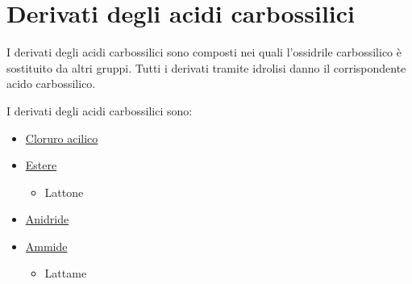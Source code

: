 \chapter{Derivati degli acidi carbossilici}
I derivati degli acidi carbossilici sono composti nei quali l'ossidrile carbossilico è sostituito da altri gruppi. Tutti i derivati tramite idrolisi danno il corrispondente acido carbossilico.

I derivati degli acidi carbossilici sono:

\begin{minipage}{.4\textwidth}
	\begin{itemize}
		\item \hyperref[sec:cloruriAcilici]{Cloruro acilico}
		      \begin{figure}[H]
			      \centering
		      \end{figure}
		\item \hyperref[sec:esteri]{Estere}
		      \begin{figure}[H]
			      \centering
		      \end{figure}
		      \begin{itemize}
			      \item Lattone
			            \begin{figure}[H]
				            \centering
			            \end{figure}
		      \end{itemize}
	\end{itemize}
\end{minipage}
\begin{minipage}{.4\textwidth}
	\vspace{10pt}
	\begin{itemize}
		\item \hyperref[sec:anidridi]{Anidride}
		      \begin{figure}[H]
			      \centering
		      \end{figure}
		\item \hyperref[sec:ammidi]{Ammide}
		      \begin{figure}[H]
			      \centering
		      \end{figure}
		      \begin{itemize}
			      \item Lattame
			            \begin{figure}[H]
				            \centering
			            \end{figure}
		      \end{itemize}
	\end{itemize}
\end{minipage}

